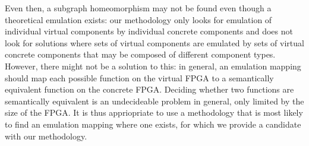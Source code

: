 Even then, a subgraph homeomorphism may not be found even though a theoretical emulation exists: our methodology only looks for emulation of individual virtual components by individual concrete components and does not look for solutions where sets of virtual components are emulated by sets of virtual concrete components that may be composed of different component types. However, there might not be a solution to this: in general, an emulation mapping should map each possible function on the virtual FPGA to a semantically equivalent function on the concrete FPGA. Deciding whether two functions are semantically equivalent is an undecideable problem in general, only limited by the size of the FPGA. It is thus appriopriate to use a methodology that is most likely to find an emulation mapping where one exists, for which we provide a candidate with our methodology.